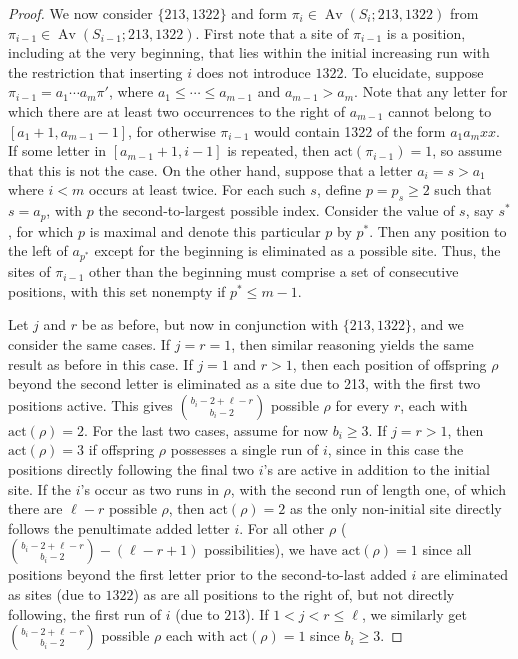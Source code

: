 \documentclass[11pt]{amsart}
\theoremstyle{plain}
\theoremstyle{definition}
\DeclareMathOperator{\Av}{Av}
\begin{document}
\begin{proof}
We now consider $\{213,1322\}$ and form $\pi_i \in \Av(S_i;213,1322)$ from $\pi_{i-1}\in
\Av(S_{i-1};213,1322)$.  First note that a site of $\pi_{i-1}$ is a position, including at
the very beginning, that lies within the initial increasing run with the restriction that inserting
$i$ does not introduce $1322$.  To elucidate, suppose $\pi_{i-1}=a_1\cdots a_m \pi'$, where
$a_1\leq\cdots \leq  a_{m-1}$ and $a_{m-1}>a_m$.  Note that any letter for which there are at least
two occurrences to the right of $a_{m-1}$ cannot belong to $[a_1+1,a_{m-1}-1]$, for otherwise
$\pi_{i-1}$ would contain 1322 of the form $a_1a_mxx$.  If some letter in $[a_{m-1}+1,i-1]$ is
repeated, then $\text{act}(\pi_{i-1})=1$, so assume that this is not the case.  On the other hand,
suppose that a letter $a_i=s>a_1$ where $i<m$ occurs at least twice. For each such $s$, define $p=p_s
\geq 2$ such that $s=a_p$, with $p$ the second-to-largest possible index.  Consider the value of $s$,
say $s^*$, for which $p$ is maximal and denote this particular $p$ by $p^*$.  Then any position to
the left of $a_{p^*}$ except for the beginning is eliminated as a possible site. Thus, the sites of
$\pi_{i-1}$ other than the beginning must comprise a set of consecutive positions, with this set
nonempty if $p^*\leq m-1$.

Let $j$ and $r$ be as before, but now in conjunction with $\{213,1322\}$, and we consider the same
cases.  If $j=r=1$, then similar reasoning yields the same result as before in this case.  If $j=1$
and $r>1$, then each position of offspring $\rho$ beyond the second letter is eliminated as a site
due to 213, with the first two positions active.  This gives $\binom{b_i-2+\ell-r}{b_i-2}$ possible
$\rho$ for every $r$, each with $\text{act}(\rho)=2$.  For the last two cases, assume for now $b_i
\geq 3$.  If $j=r>1$, then $\text{act}(\rho)=3$ if offspring $\rho$ possesses a single run of $i$,
since in this case the positions directly following the final two $i$'s are active in addition to the
initial site.  If the $i$'s occur as two runs in $\rho$, with the second run of length one, of which
there are $\ell-r$ possible $\rho$, then $\text{act}(\rho)=2$ as the only non-initial site directly
follows the penultimate added letter $i$.  For all other $\rho$
($\binom{b_i-2+\ell-r}{b_i-2}-(\ell-r+1)$ possibilities), we have $\text{act}(\rho)=1$ since all
positions beyond the first letter prior to the second-to-last added $i$ are eliminated as sites (due
to $1322$) as are all positions to the right of, but not directly following, the first run of $i$
(due to $213$).  If $1 < j <r \leq \ell$, we similarly get $\binom{b_i-2+\ell-r}{b_i-2}$ possible
$\rho$ each with $\text{act}(\rho)=1$ since $b_i\geq 3$.


\end{proof}
\end{document}
